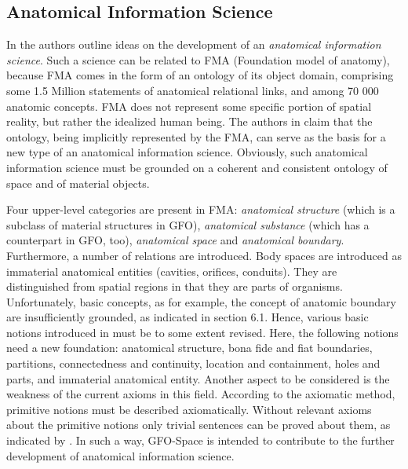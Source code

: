 \documentclass{ao2e}
\begin{document}
{ 

\subsection{Anatomical Information Science}
In \cite{smith-b-2005-a} the authors outline ideas on the development of an {\it anatomical information science}. Such a science can be related to FMA (Foundation model of anatomy), because FMA comes in the form of an ontology of its object domain, comprising some 1.5 Million statements of anatomical relational links, and among 70 000 anatomic concepts. FMA does not represent some specific portion of spatial reality, but rather the idealized human being. The authors in \cite{smith-b-2005-a} claim that the ontology, being implicitly represented by the FMA, can serve as the basis for a new type of an anatomical information science. Obviously, such anatomical information science must be grounded on a coherent and consistent ontology of space and of material objects.

Four upper-level categories are present in FMA: {\it anatomical structure} (which is a subclass of material structures in GFO), {\it anatomical substance} (which has a counterpart in GFO, too), {\it anatomical space} and {\it anatomical boundary}. Furthermore, a number of relations are introduced.
Body spaces are introduced as immaterial anatomical entities (cavities, orifices, conduits). They are distinguished from spatial regions in that they are parts of organisms. Unfortunately, basic concepts, as for example, the concept of anatomic boundary are insufficiently grounded, as indicated in section 6.1. Hence, various basic notions introduced in \cite{smith-b-2005-a} must be to some extent revised. Here, the following notions need a new foundation: anatomical structure, bona fide and fiat boundaries, partitions, connectedness and continuity, location and containment, holes and parts, and immaterial anatomical entity. Another aspect to be considered is the weakness
of the current axioms in this field. According to the axiomatic method, primitive notions must be described axiomatically. Without relevant axioms about the primitive notions only trivial sentences can be proved about them, as indicated by \cite{heller-b-2004-b}.
In such a way, GFO-Space is intended to contribute to the further development of anatomical information science.






}
\end{document}
